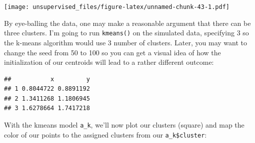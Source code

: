 \documentclass[]{article}
\newenvironment{Shaded}{\begin{snugshade}}{\end{snugshade}}
\newcommand{\DataTypeTok}[1]{\textcolor[rgb]{0.13,0.29,0.53}{#1}}
\newcommand{\DecValTok}[1]{\textcolor[rgb]{0.00,0.00,0.81}{#1}}
\newcommand{\FloatTok}[1]{\textcolor[rgb]{0.00,0.00,0.81}{#1}}
\newcommand{\KeywordTok}[1]{\textcolor[rgb]{0.13,0.29,0.53}{\textbf{#1}}}
\newcommand{\NormalTok}[1]{#1}
\newcommand{\OperatorTok}[1]{\textcolor[rgb]{0.81,0.36,0.00}{\textbf{#1}}}
\newcommand{\StringTok}[1]{\textcolor[rgb]{0.31,0.60,0.02}{#1}}
\begin{document}
\texttt{[image: unsupervised\_files/figure-latex/unnamed-chunk-43-1.pdf]}

By eye-balling the data, one may make a reasonable argument that there
can be three clusters. I'm going to run \texttt{kmeans()} on the
simulated data, specifying 3 so the k-means algorithm would use 3 number
of clusters. Later, you may want to change the seed from 50 to 100 so
you can get a visual idea of how the initialization of our centroids
will lead to a rather different outcome:

\begin{Shaded}
\end{Shaded}

\begin{verbatim}
##           x         y
## 1 0.8044722 0.8891192
## 2 1.3411268 1.1806945
## 3 1.6278664 1.7417218
\end{verbatim}

With the kmeans model \texttt{a\_k}, we'll now plot our clusters
(square) and map the color of our points to the assigned clusters from
our \texttt{a\_k\$cluster}:

\begin{Shaded}
\end{Shaded}
\end{document}
